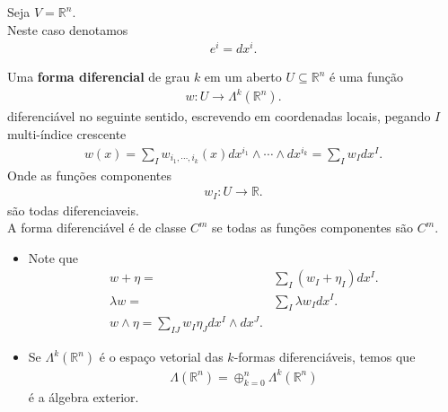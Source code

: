 \begin{notation}
  Seja $V=\mathbb{R}^{n}$.\\
  Neste caso denotamos
  \begin{align*}
    e^{i}=dx^{i}.
  \end{align*}
\end{notation}
\begin{definition}
  Uma \textbf{forma diferencial} de grau $k$ em um aberto $U\subseteq\mathbb{R}^{n}$ é uma função
  \begin{align*}
    w:U\to\Lambda^{k}(\mathbb{R}^{n}).
  \end{align*}
  diferenciável no seguinte sentido, escrevendo em coordenadas locais, pegando $I$ multi-índice crescente 
  \begin{align*}
    w(x)=\sum_{I}w_{i_1,\cdots,i_k}(x)dx^{i_1}\wedge\cdots\wedge dx^{i_k}=\sum_{I}w_{I}dx^{I}.
  \end{align*}
  Onde as funções componentes
  \begin{align*}
    w_{I}:U\to\mathbb{R}.
  \end{align*}
  são todas diferenciaveis.\\
  A forma diferenciável é de classe $C^{m}$ se todas as funções componentes são $C^{m}$. 
\end{definition}
\begin{note}
  \begin{itemize}
    \item Note que
      \begin{align*}
        w+\eta=&\sum_{I}(w_I+\eta_I)dx^{I}.\\
        \lambda w=&\sum_{I}\lambda w_Idx^{I}.\\
        w\wedge\eta=\sum_{IJ}w_I\eta_{J}dx^{I}\wedge dx^{J}.
      \end{align*}
    \item Se $\Lambda^{k}(\mathbb{R}^{n})$ é o espaço vetorial das $k$-formas diferenciáveis, temos que
    \begin{align*}
      \Lambda(\mathbb{R}^{n})=\oplus_{k=0}^{n}\Lambda^{k}(\mathbb{R}^{n})
    \end{align*}
    é a álgebra exterior.
  \end{itemize}
\end{note}
